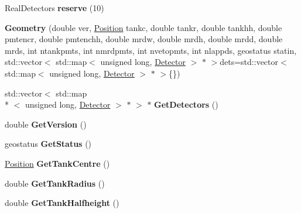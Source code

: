 \begin{DoxyCompactItemize}
\item 
\hypertarget{classGeometry_ab5170692a6cbe471976e851f79e9319a}{Real\-Detectors {\bfseries reserve} (10)}\label{classGeometry_ab5170692a6cbe471976e851f79e9319a}

\item 
\hypertarget{classGeometry_a6f68b0647ccbaf76ba714730451dc3cf}{{\bfseries Geometry} (double ver, \hyperlink{classPosition}{Position} tankc, double tankr, double tankhh, double pmtencr, double pmtenchh, double mrdw, double mrdh, double mrdd, double mrds, int ntankpmts, int nmrdpmts, int nvetopmts, int nlappds, geostatus statin, std\-::vector$<$ std\-::map$<$ unsigned long, \hyperlink{classDetector}{Detector} $>$ $\ast$ $>$dets=std\-::vector$<$ std\-::map$<$ unsigned long, \hyperlink{classDetector}{Detector} $>$ $\ast$ $>$\{\})}\label{classGeometry_a6f68b0647ccbaf76ba714730451dc3cf}

\item 
\hypertarget{classGeometry_afbfabb07e8f8cad1496e2b69db8addb8}{std\-::vector$<$ std\-::map\\*
$<$ unsigned long, \hyperlink{classDetector}{Detector} $>$ $\ast$ $>$ $\ast$ {\bfseries Get\-Detectors} ()}\label{classGeometry_afbfabb07e8f8cad1496e2b69db8addb8}

\item 
\hypertarget{classGeometry_a94c52a826664f141dd3246fa1478a475}{double {\bfseries Get\-Version} ()}\label{classGeometry_a94c52a826664f141dd3246fa1478a475}

\item 
\hypertarget{classGeometry_a21835bb3d23fd54895350c84471dfb02}{geostatus {\bfseries Get\-Status} ()}\label{classGeometry_a21835bb3d23fd54895350c84471dfb02}

\item 
\hypertarget{classGeometry_a804b7ce9d8f1abe1ce5fffe9da65af51}{\hyperlink{classPosition}{Position} {\bfseries Get\-Tank\-Centre} ()}\label{classGeometry_a804b7ce9d8f1abe1ce5fffe9da65af51}

\item 
\hypertarget{classGeometry_abc3f55a2c64ec9f83a0ea7e82724fe49}{double {\bfseries Get\-Tank\-Radius} ()}\label{classGeometry_abc3f55a2c64ec9f83a0ea7e82724fe49}

\item 
\hypertarget{classGeometry_acc0459993448786f92dbdad8c4652176}{double {\bfseries Get\-Tank\-Halfheight} ()}\label{classGeometry_acc0459993448786f92dbdad8c4652176}


\end{DoxyCompactItemize}
